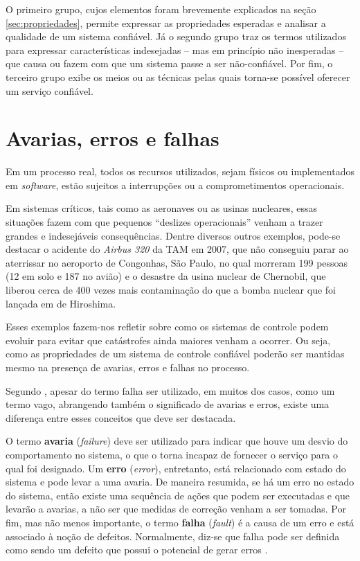 O primeiro grupo, cujos elementos foram brevemente explicados na seção
\ref{sec:propriedades}, permite expressar as propriedades esperadas e analisar a
qualidade de um sistema confiável. Já o segundo grupo traz os termos utilizados
para expressar características indesejadas -- mas em princípio não inesperadas
-- que causa ou fazem com que um sistema passe a ser não-confiável. Por fim, o
terceiro grupo exibe os meios ou as técnicas pelas quais torna-se possível
oferecer um serviço confiável.

\section{Avarias, erros e falhas}\label{sec:avaria_erro_falha}
Em um processo real, todos os recursos utilizados, sejam físicos ou
implementados em {\it software}, estão sujeitos a interrupções ou a
comprometimentos operacionais.

Em sistemas críticos, tais como as aeronaves ou as usinas nucleares, essas
situações fazem com que pequenos ``deslizes operacionais'' venham a trazer
grandes e indesejáveis consequências. Dentre diversos outros exemplos, pode-se
destacar o acidente do {\it Airbus 320} da TAM em 2007, que não conseguiu parar
ao aterrissar no aeroporto de Congonhas, São Paulo, no qual morreram 199 pessoas
(12 em solo e 187 no avião) e o desastre da usina nuclear de Chernobil, que
liberou cerca de 400 vezes mais contaminação do que a bomba nuclear que foi
lançada em de Hiroshima.

Esses exemplos fazem-nos refletir sobre como os sistemas de controle podem
evoluir para evitar que catástrofes ainda maiores venham a ocorrer. Ou seja,
como as propriedades de um sistema de controle confiável poderão ser mantidas
mesmo na presença de avarias, erros e falhas no processo.

Segundo , apesar do termo falha ser utilizado, em muitos
dos casos, como um termo vago, abrangendo também o significado de avarias e
erros, existe uma diferença entre esses conceitos que deve ser destacada.

O termo {\bf avaria} ({\it failure}) deve ser utilizado para indicar que houve
um desvio do comportamento no sistema, o que o torna incapaz de fornecer o
serviço para o qual foi designado. Um {\bf erro} ({\it error}), entretanto, está
relacionado com estado do sistema e pode levar a uma avaria. De maneira
resumida, se há um erro no estado do sistema, então existe uma sequência de
ações que podem ser executadas e que levarão a avarias, a não ser que medidas de
correção venham a ser tomadas. Por fim, mas não menos importante, o termo {\bf
falha} ({\it fault}) é a causa de um erro e está associado à noção de defeitos.
Normalmente, diz-se que falha pode ser definida como sendo um defeito que possui
o potencial de gerar erros \cite{nelio:2002,weber:2002}.

